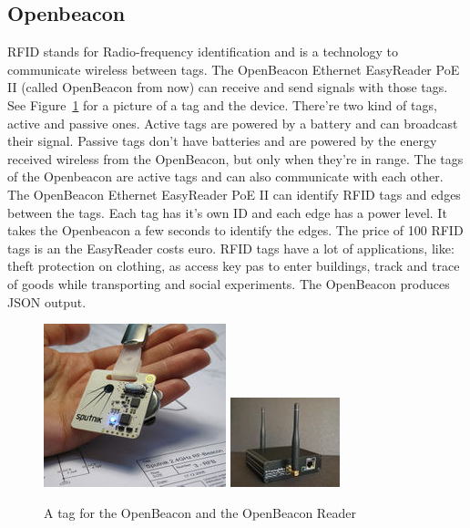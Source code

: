 	\subsection{Openbeacon}
	RFID stands for Radio-frequency identification and is a technology to communicate wireless between tags. The OpenBeacon Ethernet EasyReader PoE II (called OpenBeacon from now) can receive and send signals with those tags. See Figure~\ref{fig:openbeacon} for a picture of a tag and the device. There're two kind of tags, active and passive ones. Active tags are powered by a battery and can broadcast their signal. Passive tags don't have batteries and are powered by the energy received wireless from the OpenBeacon, but only when they're in range. The tags of the Openbeacon are active tags and can also communicate with each other. The OpenBeacon Ethernet EasyReader PoE II can identify RFID tags and edges between the tags. Each tag has it's own ID and each edge has a power level. It takes the Openbeacon a few seconds to identify the edges. The price of 100 RFID tags is  an the EasyReader costs  euro. RFID tags have a lot of applications, like: theft protection on clothing, as access key pas to enter buildings, track and trace of goods while transporting and social experiments\cite{2008arXiv0811.4170B}. The OpenBeacon produces JSON output.


			\begin{figure}[h]
				\label{fig:openbeacon}
				\centering
					\includegraphics[scale=0.5]{tag.jpg}
					\includegraphics[scale=1.0]{reader.jpg}
					
					\caption{A tag for the OpenBeacon\cite{openbeacon} and the OpenBeacon Reader}

			\end{figure}


